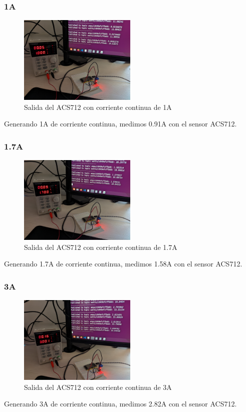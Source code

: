 \begin{titlepage}
\subsubsection{1A}
\begin{figure}[h!]
	\centering
	\includegraphics[width=0.5\textwidth]{imagenes/DC_1Amp.jpg}
	\caption{Salida del ACS712 con corriente continua de 1A}
\end{figure}
Generando 1A de corriente continua, medimos 0.91A con el sensor ACS712. \\
\subsubsection{1.7A}
\begin{figure}[h!]
	\centering
	\includegraphics[width=0.5\textwidth]{imagenes/DC_1_7Amp.jpg}
	\caption{Salida del ACS712 con corriente continua de 1.7A}
\end{figure}
Generando 1.7A de corriente continua, medimos 1.58A con el sensor ACS712. \\
\subsubsection{3A}
\begin{figure}[h!]
	\centering
	\includegraphics[width=0.5\textwidth]{imagenes/DC_3Amps.jpg}
	\caption{Salida del ACS712 con corriente continua de 3A}
\end{figure}
Generando 3A de corriente continua, medimos 2.82A con el sensor ACS712. \\


\end{titlepage}
